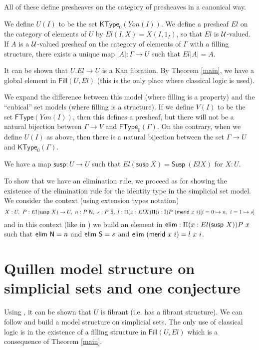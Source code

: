 \documentclass[10pt,a4paper]{article}
\newcommand{\north}{{\sf N}}
\newcommand{\south}{{\sf S}}
\newcommand{\merid}{{\sf merid}}
\newcommand{\elim}{{\sf elim}}
\newcommand{\II}{\mathbb{I}}
\newcommand{\Susp}{\mathsf{Susp}}
\newcommand{\susp}{\mathsf{susp}}
\newcommand{\Fill}{\mathsf{Fill}}
\def\KType{\mathsf{KType}}
\def\FType{\mathsf{FType}}
\begin{document}
All of these define 
presheaves on the category of presheaves in a canonical way.

 We define $U(I)$ to be the set $\KType_0(Yon(I))$.
We define a presheaf $El$ on the category of elements of $U$ by
$El(I,X) = X(I,1_I)$, so that $El$ is ${\cal U}$-valued. 
If $A$ is a ${\cal U}$-valued presheaf on the category
of elements of $\Gamma$ with a filling structure, there exists a unique map $|A|:\Gamma\rightarrow U$
such that $El|A| = A$.

 It can be shown that $U.El\rightarrow U$ is a Kan fibration.
By Theorem \ref{main}, we have a global element in $\Fill(U,El)$
(this is the only place where classical logic is used).

 We expand the difference between this model (where filling is a property)
and the ``cubical'' set models (where filling is a structure). If we
define $V(I)$ to be the set $\FType(Yon(I))$, then this defines a presheaf, but there
will not be a natural bijection between $\Gamma\rightarrow V$
and $\FType_0(\Gamma)$.
On the contrary, when we define $U(I)$ as above, then there is a natural
bijection between the set $\Gamma\rightarrow U$
and $\KType_0(\Gamma)$.

We have a map $\susp:U\rightarrow U$ such that 
$El (\susp~X) = \Susp~(El X)$ for $X:U$.

 To show that we have an elimination rule, we proceed as for showing the existence
of the elimination rule for the identity type in the simplicial set model.
We consider the context (using extension types notation)
$$
X:U,~P:El(\susp~X)\rightarrow U,~n:P~\north,~s:P~\south,
~l:\Pi (x:El X)\Pi (i:\II)P~(\merid~x~i)[i=0\mapsto n,~i=1\mapsto s]
$$
and in this context (like in \cite{CHM}) we 
build an element in $\elim:\Pi (x:El (\susp~X))P~x$ such that
$\elim~\north = n$ and $\elim~\south = s$ and $\elim~(\merid~x~i) =           
l~x~i$.

\section{Quillen model structure on simplicial sets and one conjecture}

 Using \cite{OP}, it can be shown that $U$ is fibrant
(i.e. has a fibrant structure). We can follow \cite{Sattler}
and build a model structure on simplicial sets. The only use of
classical logic is in the existence of a filling structure in $\Fill(U,El)$
which is a consequence of Theorem \ref{main}.

\medskip
\end{document}
